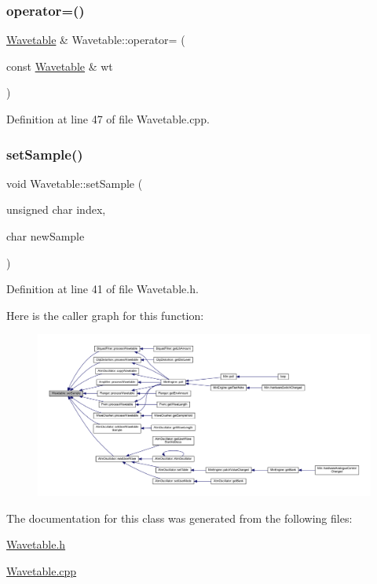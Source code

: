 \subsubsection{\texorpdfstring{operator=()}{operator=()}}
{\footnotesize\ttfamily \hyperlink{class_wavetable}{Wavetable} \& Wavetable\+::operator= (\begin{DoxyParamCaption}\item[{const \hyperlink{class_wavetable}{Wavetable} \&}]{wt }\end{DoxyParamCaption})}



Definition at line 47 of file Wavetable.\+cpp.

\mbox{\label{class_wavetable_a01485340698b4bf92f3065f31feaf4c4}} 
\subsubsection{\texorpdfstring{set\+Sample()}{setSample()}}
{\footnotesize\ttfamily void Wavetable\+::set\+Sample (\begin{DoxyParamCaption}\item[{unsigned char}]{index,  }\item[{char}]{new\+Sample }\end{DoxyParamCaption})\hspace{0.3cm}{\ttfamily [inline]}}



Definition at line 41 of file Wavetable.\+h.

Here is the caller graph for this function\+:
\nopagebreak
\begin{figure}[H]
\begin{center}
\leavevmode
\includegraphics[width=350pt]{class_wavetable_a01485340698b4bf92f3065f31feaf4c4_icgraph}
\end{center}
\end{figure}


The documentation for this class was generated from the following files\+:\begin{DoxyCompactItemize}
\item 
\hyperlink{_wavetable_8h}{Wavetable.\+h}\item 
\hyperlink{_wavetable_8cpp}{Wavetable.\+cpp}\end{DoxyCompactItemize}
